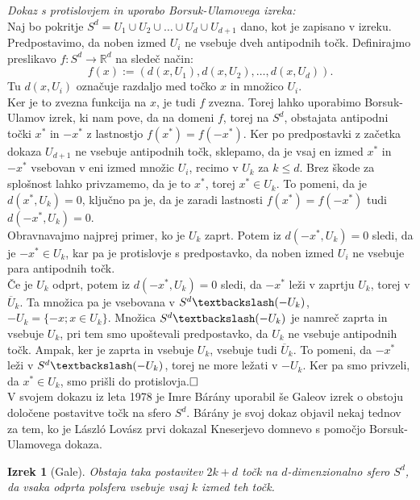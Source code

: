 \documentclass[a4paper,12pt]{article}
\def\qed{$\hfill\Box$}   %
\newtheorem{izrek}{Izrek}
\begin{document}
\noindent
{\em Dokaz s protislovjem in uporabo Borsuk-Ulamovega izreka:} \\
\indent Naj bo pokritje $S^d = U_1 \cup U_2 \cup \ldots \cup U_d \cup U_{d+1}$ dano, kot je zapisano v izreku. Predpostavimo, da noben izmed $U_i$ ne vsebuje dveh antipodnih točk. Definirajmo preslikavo $f:S^d \rightarrow \mathbb{R}^d$ na sledeč način:
$$f(x) := (d(x,U_1), d(x,U_2), \ldots, d(x,U_d)).$$
Tu $d(x,U_i)$ označuje razdaljo med točko $x$ in množico $U_i$. \\
\indent Ker je to zvezna funkcija na $x$, je tudi $f$ zvezna. Torej lahko uporabimo Borsuk-Ulamov izrek, ki nam pove, da na domeni $f$, torej na $S^d$, obstajata antipodni točki $x^*$ in $-x^*$ z lastnostjo $f(x^*)=f(-x^*)$. Ker po predpostavki z začetka dokaza $U_{d+1}$ ne vsebuje antipodnih točk, sklepamo, da je vsaj en izmed $x^*$ in $-x^*$ vsebovan v eni izmed množic $U_i$, recimo v $U_k$ za $k\leq d$. Brez škode za splošnost lahko privzamemo, da je to $x^*$, torej $x^* \in U_k$. To pomeni, da je $d(x^*, U_k) = 0$, ključno pa je, da je zaradi lastnosti $f(x^*)=f(-x^*)$ tudi $d(-x^*, U_k) = 0$.\\
\indent Obravnavajmo najprej primer, ko je $U_k$ zaprt. Potem iz $d(-x^*, U_k) = 0$ sledi, da je $-x^* \in U_k$, kar pa je protislovje s predpostavko, da noben izmed $U_i$ ne vsebuje para antipodnih točk.\\
\indent Če je $U_k$ odprt, potem iz $d(-x^*, U_k) = 0$ sledi, da $-x^*$ leži v zaprtju $U_k$, torej v $\overline U_k$. Ta množica pa je vsebovana v $S^d\textbackslash(-U_k)$, \mbox{$-U_k = \{-x;x \in U_k\}$}. Množica $S^d\textbackslash(-U_k)$ je namreč zaprta in vsebuje $U_k$, pri tem smo upoštevali predpostavko, da $U_k$ ne vsebuje antipodnih točk. Ampak, ker je zaprta in vsebuje $U_k$, vsebuje tudi $\overline U_k$. To pomeni, da $-x^*$ leži v  $S^d\textbackslash(-U_k)$, torej ne more ležati v $-U_k$. Ker pa smo privzeli, da $x^* \in U_k$, smo prišli do protislovja.\qed \newline \\

V svojem dokazu iz leta 1978 je Imre Bárány uporabil še Galeov izrek o obstoju določene postavitve točk na sfero $S^d$. Bárány je svoj dokaz objavil nekaj tednov za tem, ko je László Lovász prvi dokazal Kneserjevo domnevo s pomočjo Borsuk-Ulamovega dokaza.

\begin{izrek}[Gale]
Obstaja taka postavitev $2k+d$ točk na $d$-dimenzionalno sfero $S^d$, da vsaka odprta polsfera vsebuje vsaj $k$ izmed teh točk.
\end{izrek}
\end{document}
